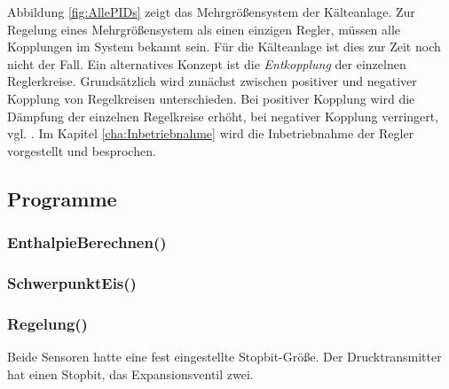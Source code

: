Abbildung \ref{fig:AllePIDs} zeigt das Mehrgrößensystem der Kälteanlage. Zur Regelung eines Mehrgrößensystem als einen einzigen Regler, müssen alle Kopplungen im System bekannt sein. Für die Kälteanlage ist dies zur Zeit noch nicht der Fall. 
Ein alternatives Konzept ist die \textit{Entkopplung} der einzelnen Reglerkreise. Grundsätzlich wird zunächst zwischen positiver und negativer Kopplung von Regelkreisen unterschieden. Bei positiver Kopplung wird die Dämpfung der einzelnen Regelkreise erhöht, bei negativer Kopplung verringert, vgl. \citep{Schwarz2013}. Im Kapitel \ref{cha:Inbetriebnahme} wird die  Inbetriebnahme der Regler vorgestellt und besprochen.   










\subsection{Programme}
\label{subsec:Programme}

\subsubsection*{EnthalpieBerechnen()}

\subsubsection*{SchwerpunktEis()}

\subsubsection*{Regelung()}


Beide Sensoren hatte eine fest eingestellte Stopbit-Größe. Der Drucktransmitter hat einen Stopbit, das Expansionsventil zwei.



